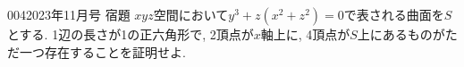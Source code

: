\begin{prob}{004}{}{2023年11月号 宿題}
 $xyz$空間において$y^3 + z(x^2 + z^2)=0$で表される曲面を$S$とする. 1辺の長さが1の正六角形で, 2頂点が$x$軸上に, 4頂点が$S$上にあるものがただ一つ存在することを証明せよ.
\end{prob}
